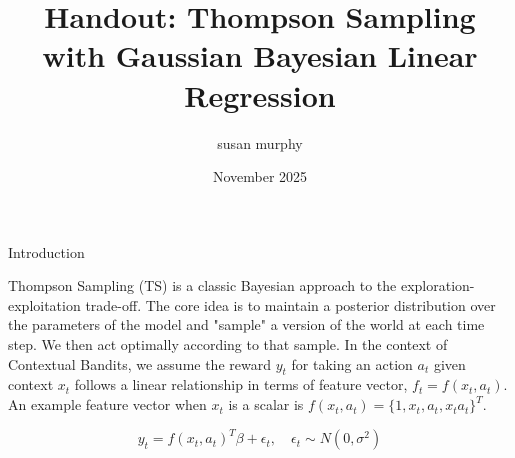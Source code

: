 \documentclass{article}
\title{Handout: Thompson Sampling with Gaussian Bayesian Linear Regression}
\author{susan murphy}
\date{November 2025}
\begin{document}
\maketitle

\noindent Introduction

Thompson Sampling (TS) is a classic Bayesian approach to the exploration-exploitation trade-off. The core idea is to maintain a posterior distribution over the parameters of the model and "sample" a version of the world at each time step. We then act optimally according to that sample.
In the context of Contextual Bandits, we assume the reward $y_t$ for taking an action $a_t$ given context $x_t$ follows a linear relationship in terms of feature  vector, $f_t=f(x_t, a_t)$.  An example feature vector when $x_t$ is a scalar is $f(x_t, a_t)= \{1, x_t, a_t, x_ta_t\}^T$.

$$y_t = f(x_t, a_t)^T \beta + \epsilon_t, \quad \epsilon_t \sim N(0, \sigma^2)$$\\
\end{document}
